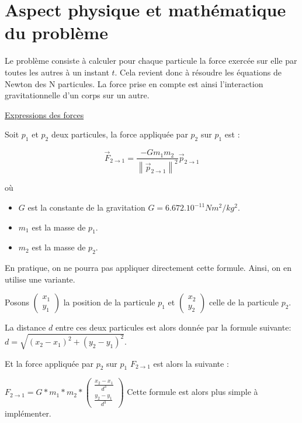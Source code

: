 \chapter{Aspect physique et mathématique du problème}
Le problème consiste à calculer pour chaque particule la force exercée sur elle par toutes les autres à un instant $t$.
Cela revient donc à résoudre les équations de Newton des N particules. La force prise en compte est ainsi l'interaction gravitationnelle d'un corps sur un autre.

\vspace{3mm}
\underline{Expressions des forces}
\vspace{2mm}

Soit $p_{1}$ et $p_{2}$ deux particules, la force appliquée par $p_2$ sur $p_1$ est :

\begin{equation}
\vec{F}_{2 \rightarrow 1} = \frac{-Gm_1m_2}{{\left\| \vec{p}_{2 \rightarrow 1} \right\|}^2} \vec{p}_{2 \rightarrow 1}
\end{equation}

où 
\begin{itemize}
\item  $G$ est la constante de la gravitation $G = {6.672.10^{-11}}{Nm^2/kg^2}$.

\item $m_1$ est la masse de $p_1$.
\item $m_2$ est la masse de $p_2$.

\end{itemize}

\vspace{2mm}

En pratique, on ne pourra pas appliquer directement cette formule. Ainsi, on en utilise une variante.

Posons $\begin{pmatrix}
x_1\\
y_1
\end{pmatrix}$ la position de la particule $p_1$ et $\begin{pmatrix}
x_2\\
y_2
\end{pmatrix}$ celle de la particule $p_2$.

La distance $d$ entre ces deux particules est alors donnée par la formule suivante:
$d= \sqrt{(x_2-x_1)^2 + (y_2 - y_1)^2}$.

Et la force appliquée par $p_2$ sur $p_1$ $F_{2 \rightarrow 1}$ est alors la suivante :

$F_{2 \rightarrow 1}=G*m_1*m_2*\begin{pmatrix}
\frac{x_2 -x_1}{d^3}\\
\frac{y_2 -y_1}{d^3}
\end{pmatrix}
$
Cette formule est alors plus simple à implémenter.


